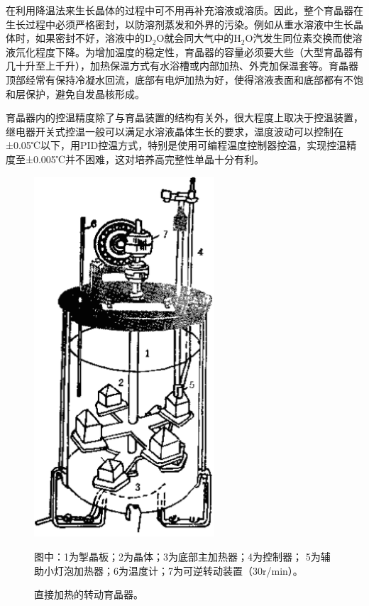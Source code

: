 在利用降温法来生长晶体的过程中可不用再补充溶液或溶质。因此，整个育晶器在生长过程中必须严格密封，以防溶剂蒸发和外界的污染。例如从重水溶液中生长晶体时，如果密封不好，溶液中的D$_2$O就会同大气中的H$_2$O汽发生同位素交换而使溶液氘化程度下降。为增加温度的稳定性，育晶器的容量必须要大些（大型育晶器有几十升至上千升），加热保温方式有水浴槽或内部加热、外壳加保温套等。育晶器顶部经常有保持冷凝水回流，底部有电炉加热为好，使得溶液表面和底部都有不饱和层保护，避免自发晶核形成。

育晶器内的控温精度除了与育晶装置的结构有关外，很大程度上取决于控温装置，继电器开关式控温一般可以满足水溶液晶体生长的要求，温度波动可以控制在±0.05℃以下，用PID控温方式，特别是使用可编程温度控制器控温，实现控温精度至±0.005℃并不困难，这对培养高完整性单晶十分有利。

\begin{figure}[h]
 \centering
 \includegraphics[width=0.6\textwidth]{fig/cp03/img3.19.jpg}
 \caption{直接加热的转动育晶器。}
 图中：1为掣晶板；2为晶体；3为底部主加热器；4为控制器； 5为辅助小灯泡加热器；6为温度计；7为可逆转动装置（30r/min）。
\end{figure}


